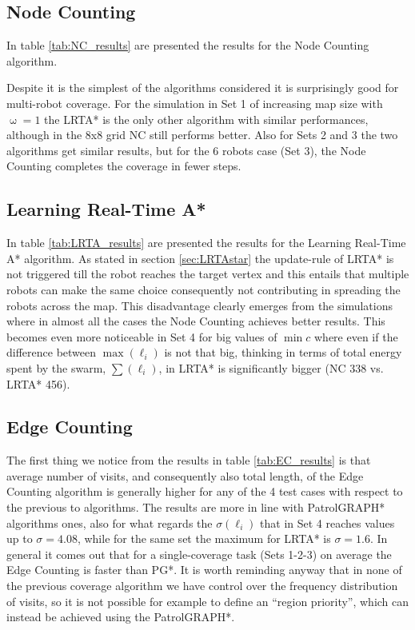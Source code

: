 
\subsection{Node Counting}

In table \ref{tab:NC_results} are presented the results for the Node Counting algorithm.



Despite it is the simplest of the algorithms considered it is surprisingly good for multi-robot coverage. For the simulation in Set 1 of increasing map size with $\upomega=1$ the LRTA* is the only other algorithm with similar performances, although in the 8x8 grid NC still performs better. Also for Sets 2 and 3 the two algorithms get similar results, but for the 6 robots case (Set 3), the Node Counting completes the coverage in fewer steps. 


\subsection{Learning Real-Time A*}

In table \ref{tab:LRTA_results} are presented the results for the Learning Real-Time A* algorithm. As stated in section \ref{sec:LRTAstar} the update-rule of LRTA* is not triggered till the robot reaches the target vertex and this entails that multiple robots can make the same choice consequently not contributing in spreading the robots across the map. This disadvantage clearly emerges from the simulations where in almost all the cases the Node Counting achieves better results. This becomes even more noticeable in Set 4 for big values of $\min c$ where even if the difference between $\max (\ell_i)$ is not that big, thinking in terms of total energy spent by the swarm, $\sum(\ell_i)$, in LRTA* is significantly bigger (NC 338 vs. LRTA* 456).





\subsection{Edge Counting}

The first thing we notice from the results in table \ref{tab:EC_results} is that average number of visits, and consequently also total length, of the Edge Counting algorithm is generally higher for any of the 4 test cases with respect to the previous to algorithms. The results are more in line with PatrolGRAPH* algorithms ones, also for what regards the $\sigma(\ell_i)$ that in Set 4 reaches values up to $\sigma=4.08$, while for the same set the maximum for LRTA* is $\sigma=1.6$. In general it comes out that for a single-coverage task (Sets 1-2-3) on average the Edge Counting is faster than PG*.  It is worth reminding anyway that in none of the previous coverage algorithm we have control over the frequency distribution of visits, so it is not possible for example to define an ``region priority'', which can instead be achieved using the PatrolGRAPH*.

